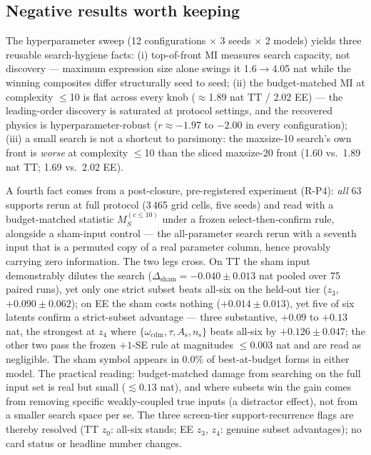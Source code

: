 \documentclass[twocolumn,10pt]{article}
\newcommand{\As}{A_\mathrm{s}}
\newcommand{\ns}{n_\mathrm{s}}
\newcommand{\omC}{\omega_\mathrm{cdm}}
\begin{document}
\subsection{Negative results worth keeping}
\label{sec:negative}

The hyperparameter sweep (12 configurations $\times$ 3 seeds $\times$ 2
models) yields three reusable search-hygiene facts: (i) top-of-front MI
measures search capacity, not discovery --- maximum expression size alone
swings it 1.6$\to$4.05 nat while the winning composites differ structurally
seed to seed; (ii) the budget-matched MI at complexity $\le$10 is flat across
every knob ($\approx$1.89 nat TT / 2.02 EE) --- the leading-order discovery is
saturated at protocol settings, and the recovered physics is
hyperparameter-robust ($r\approx-1.97$ to $-2.00$ in every configuration);
(iii) a small search is not a shortcut to parsimony: the maxsize-10 search's
own front is \emph{worse} at complexity $\le$10 than the sliced maxsize-20
front (1.60 vs.\ 1.89 nat TT; 1.69 vs.\ 2.02 EE).

A fourth fact comes from a post-closure, pre-registered experiment (R-P4):
\emph{all} 63 supports rerun at full protocol (3\,465 grid cells, five seeds)
and read with a budget-matched statistic $M_S^{(c\le10)}$ under a frozen
select-then-confirm rule, alongside a sham-input control --- the
all-parameter search rerun with a seventh input that is a permuted copy of a
real parameter column, hence provably carrying zero information. The two legs
cross. On TT the sham input demonstrably dilutes the search
($\Delta_\mathrm{sham}=-0.040\pm0.013$ nat pooled over 75 paired runs), yet
only one strict subset beats all-six on the held-out tier ($z_3$,
$+0.090\pm0.062$); on EE the sham costs nothing ($+0.014\pm0.013$), yet five
of six latents confirm a strict-subset advantage --- three substantive,
$+0.09$ to $+0.13$ nat, the strongest at $z_4$ where $\{\omC,\tau,\As,\ns\}$
beats all-six by $+0.126\pm0.047$; the other two pass the frozen $+1$-SE rule
at magnitudes $\le0.003$ nat and are read as negligible. The sham symbol appears in $0.0\%$ of
best-at-budget forms in either model. The practical reading: budget-matched
damage from searching on the full input set is real but small
($\lesssim0.13$ nat), and where subsets win the gain comes from removing
specific weakly-coupled true inputs (a distractor effect), not from a smaller
search space per se. The three screen-tier support-recurrence flags are
thereby resolved (TT $z_0$: all-six stands; EE $z_3$, $z_4$: genuine subset
advantages); no card status or headline number changes.
\end{document}
